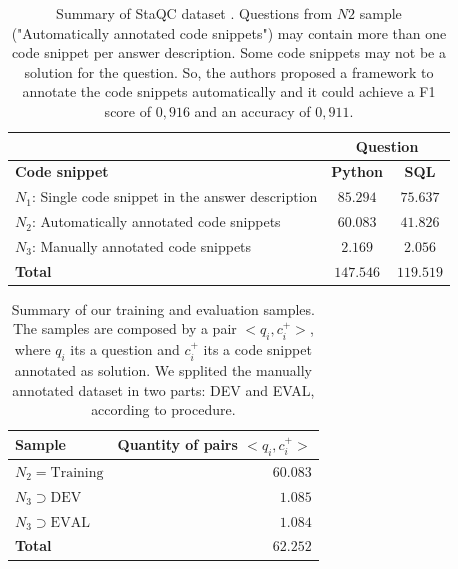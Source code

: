 \documentclass[sigconf]{acmart}
\begin{document}
\begin{table}[h]
\centering
\begin{tabular}{ p{5cm} c c }
\hline
  & \multicolumn{2}{c}{\textbf{Question}}\\
\hline
\textbf{Code snippet} & \textbf{Python} & \textbf{SQL}  \\
\hline

$N_{1}$: Single code snippet in the answer description & $85.294$ & $75.637$ \\

$N_{2}$: Automatically annotated code snippets & $60.083$ & $41.826$ \\

$N_{3}$: Manually annotated code snippets & $2.169$ & $2.056$  \\

 \hline
 \textbf{Total} & $\bm{147.546}$ & $\bm{119.519}$\\
 \hline 
 
\end{tabular}
\caption{Summary of StaQC dataset \cite{yao-2018}. Questions from $N2$ sample ("Automatically annotated code snippets") may contain more than one code snippet per answer description. Some code snippets may not be a solution for the question. So, the authors proposed a framework to annotate the code snippets automatically and it could achieve a F1 score of $0,916$ and an accuracy of $0,911$.}
\label{table:summary-training-data-yao-staqc}
\end{table}

\begin{table}[h]
\centering
\begin{tabular}{ l r  }
 \hline
 \textbf{Sample} & \textbf{Quantity of pairs $<q_{i}, c_{i}^{+}>$}\\
 \hline
 $N_{2} = \text{Training}$ & $60.083$\\
 
 $N_{3} \supset \text{DEV}$ & $1.085$ \\
 
 $N_{3} \supset \text{EVAL}$ & $1.084$\\
 \hline
 \textbf{Total} & $\bm{62.252}$\\
 \hline
\end{tabular}
\caption{Summary of our training and evaluation samples. The samples are composed by a pair $<q_{i}, c_{i}^{+}>$, where $q_{i}$ its a question and $c_{i}^{+}$ its a code snippet annotated as solution. We spplited the manually annotated dataset in two parts: DEV and EVAL, according to \cite{iyer-etal-2016-summarizing} procedure. }
\label{table:training-sample-division}
\end{table}
\end{document}
